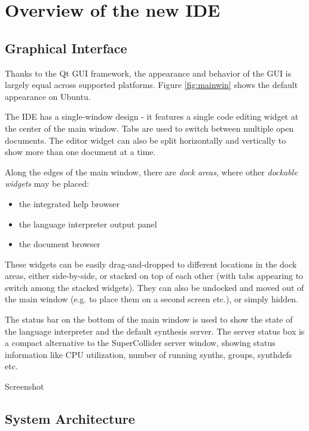 \documentclass[11pt,a4paper]{article}
\begin{document}
\section{Overview of the new IDE}

\subsection{Graphical Interface}
\label{gui}

Thanks to the Qt GUI framework, the appearance and behavior of the GUI is largely equal across supported platforms.
Figure \ref{fig:mainwin} shows the default appearance on Ubuntu.

The IDE has a single-window design - it features a single code editing widget at the center of the main window. Tabs are
used to switch between multiple open documents. The editor widget can also be split horizontally and vertically to show
more than one document at a time.

Along the edges of the main window, there are \emph{dock areas}, where other \emph{dockable widgets} may be placed:
\begin{itemize}
 \item the integrated help browser
 \item the language interpreter output panel
 \item the document browser
\end{itemize}

These widgets can be easily drag-and-dropped to different locations in the dock areas, either side-by-side, or stacked
on top of each other (with tabs appearing to switch among the stacked widgets). They can also be undocked and moved out
of the main window (e.g. to place them on a second screen etc.), or simply hidden.

The status bar on the bottom of the main window is used to show the state of the language interpreter and the default
synthesis server. The server status box is a compact alternative to the SuperCollider server window, showing status
information like CPU utilization, number of running synths, groups, synthdefs etc.

\begin{figure*}[]
  \centering
  Screenshot
  \caption{The SuperCollider IDE running on Ubuntu}
  \label{fig:mainwin}
\end{figure*}

\subsection{System Architecture}
\end{document}
